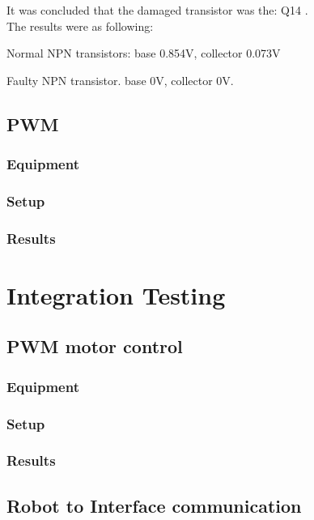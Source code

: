 It was concluded that the damaged transistor was the: Q14 \cite{Q14}  
.\\

The results were as following:\

Normal NPN transistors: base 0.854V, collector 0.073V\

Faulty NPN transistor. base 0V, collector 0V.\\

\subsection{PWM}

\subsubsection{Equipment}

\subsubsection{Setup}

\subsubsection{Results}

\section{Integration Testing}

\subsection{PWM motor control}
 
\subsubsection{Equipment}
 
\subsubsection{Setup}
 
\subsubsection{Results}
 
\subsection{Robot to Interface communication}

